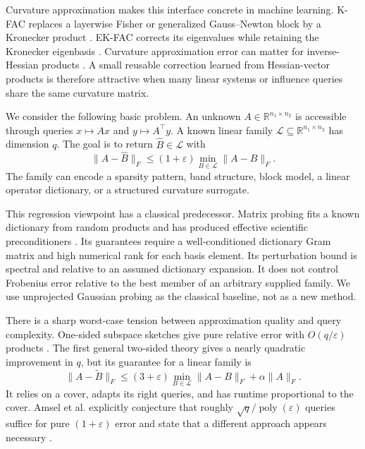 \documentclass{article}
\theoremstyle{remark}
\newcommand{\cL}{\mathcal L}
\newcommand{\eps}{\varepsilon}
\newcommand{\1}{\mathbf 1}
\begin{document}
Curvature approximation makes this interface concrete in machine learning. K-FAC replaces a layerwise Fisher or generalized Gauss--Newton block by a Kronecker product \citep{martens2015kfac}.  EK-FAC corrects its eigenvalues while retaining the Kronecker eigenbasis \citep{george2018ekfac}.  Curvature approximation error can matter for inverse-Hessian products \citep{hong2025better,wang2025astra}.  A small reusable correction learned from Hessian-vector products is therefore attractive when many linear systems or influence queries share the same curvature matrix.

We consider the following basic problem.  An unknown $A\in\mathbb R^{n_1\times n_2}$ is accessible through queries $x\mapsto Ax$ and $y\mapsto A^\top y$.  A known linear family $\cL\subseteq\mathbb R^{n_1\times n_2}$ has dimension $q$.  The goal is to return $\widehat B\in\cL$ with
\begin{equation}
 \|A-\widehat B\|_F\le(1+\eps)
 \min_{B\in\cL}\|A-B\|_F.
 \label{eq:goal}
\end{equation}
The family can encode a sparsity pattern, band structure, block model, a linear operator dictionary, or a structured curvature surrogate.

This regression viewpoint has a classical predecessor.  Matrix probing fits a known dictionary from random products and has produced effective scientific preconditioners \citep{chiu2012probing,demanet2012wave}.  Its guarantees require a well-conditioned dictionary Gram matrix and high numerical rank for each basis element.  Its perturbation bound is spectral and relative to an assumed dictionary expansion.  It does not control Frobenius error relative to the best member of an arbitrary supplied family.  We use unprojected Gaussian probing as the classical baseline, not as a new method.

There is a sharp worst-case tension between approximation quality and query complexity.  One-sided subspace sketches give pure relative error with $O(q/\eps)$ products \citep{ahle2020oblivious,chen2019active,amsel2026query}.  The first general two-sided theory gives a nearly quadratic improvement in $q$, but its guarantee for a linear family is \[ \|A-\widetilde B\|_F \le(3+\eps)\min_{B\in\cL}\|A-B\|_F+\alpha\|A\|_F. \] It relies on a cover, adapts its right queries, and has runtime proportional to the cover.  Amsel et al. explicitly conjecture that roughly $\sqrt q/\operatorname{poly}(\eps)$ queries suffice for pure $(1+\eps)$ error and state that a different approach appears necessary \citep{amsel2026query}.
\end{document}
